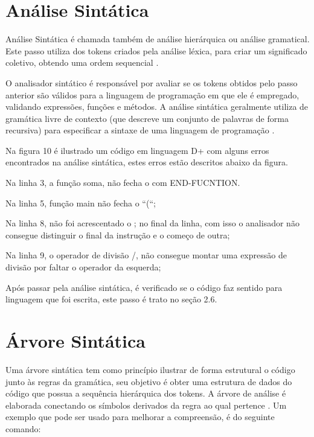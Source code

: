\documentclass[12pt,oneside,a4paper,chapter=TITLE,section=TITLE,sumario=tradicional]{abntex2}
\begin{document}
\section{Análise Sintática}
\label{sec:analise-sintatica}

Análise Sintática é chamada também de análise hierárquica ou análise gramatical. Este passo utiliza dos tokens criados pela análise léxica, para criar um significado coletivo, obtendo uma ordem sequencial \cite{alfred1995}.

O analisador sintático é responsável por avaliar se os tokens obtidos pelo passo anterior são válidos para a linguagem de programação em que ele é empregado, validando expressões, funções e métodos. A análise sintática geralmente utiliza de gramática livre de contexto (que descreve um conjunto de palavras de forma recursiva) para especificar a sintaxe de uma linguagem de programação \cite{maragon2015}.

Na figura 10 é ilustrado um código em linguagem D+ com alguns erros encontrados na análise sintática, estes erros estão descritos abaixo da figura.

\begin{figure}[htb]
\end{figure}

\begin{lista}
	\item Na linha 3, a função soma, não fecha o com END-FUCNTION.
	\item Na linha 5, função main não fecha o “(“;
	\item Na linha 8, não foi acrescentado o ; no final da linha, com isso o analisador não consegue distinguir o final da instrução e o começo de outra;
	\item Na linha 9, o operador de divisão /, não consegue montar uma expressão de divisão por faltar o operador da esquerda;
\end{lista}

Após passar pela análise sintática, é verificado se o código faz sentido para linguagem que foi escrita, este passo é trato no seção 2.6.

\section{Árvore Sintática}
\label{sec:arvoresintaticafuncadamentação}

Uma árvore sintática tem como princípio ilustrar de forma estrutural o código junto às regras da gramática, seu objetivo é obter uma estrutura de dados do código que possua a sequência hierárquica dos tokens. A árvore de análise é elaborada conectando os símbolos derivados da regra ao qual pertence \cite{appel1998}. Um exemplo que pode ser usado para melhorar a compreensão, é do seguinte comando:
\end{document}
